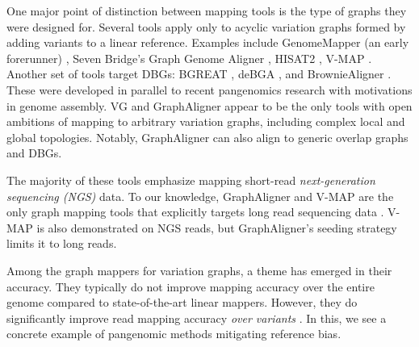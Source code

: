 




One major point of distinction between mapping tools is the type of graphs they were designed for. 
Several tools apply only to acyclic variation graphs formed by adding variants to a linear reference.
Examples include GenomeMapper (an early forerunner) \cite{Schneeberger_2009}, Seven Bridge's Graph Genome Aligner \cite{Rakocevic_2019}, HISAT2 \cite{Kim_2019}, V-MAP \cite{Vaddadi_2019}.
Another set of tools target DBGs: BGREAT \cite{Limasset_2016}, deBGA \cite{Liu_2016}, and BrownieAligner \cite{Heydari_2018}.
These were developed in parallel to recent pangenomics research with motivations in genome assembly. 
VG \cite{Garrison_2019} and GraphAligner \cite{Rautiainen_2019b} appear to be the only tools with open ambitions of mapping to arbitrary variation graphs, including complex local and global topologies.
Notably, GraphAligner can also align to generic overlap graphs and DBGs.

The majority of these tools emphasize mapping short-read \emph{next-generation sequencing (NGS)} data. 
To our knowledge, GraphAligner and V-MAP are the only graph mapping tools that explicitly targets long read sequencing data \cite{Rautiainen_2019b, Vaddadi_2019}.
V-MAP is also demonstrated on NGS reads, but GraphAligner's seeding strategy limits it to long reads.


Among the graph mappers for variation graphs, a theme has emerged in their accuracy. 
They typically do not improve mapping accuracy over the entire genome compared to state-of-the-art linear mappers. 
However, they do significantly improve read mapping accuracy \emph{over variants} \cite{Garrison_2019, Rakocevic_2019, Kim_2019}. 
In this, we see a concrete example of pangenomic methods mitigating reference bias. 

